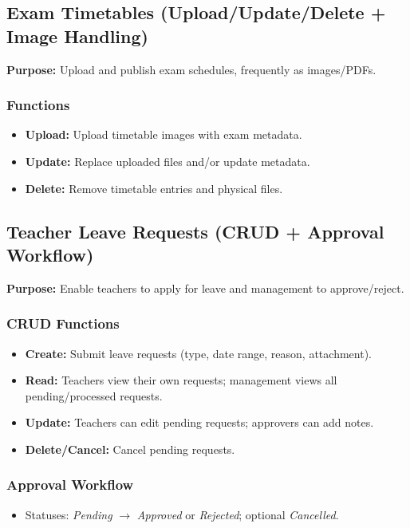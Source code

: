 \documentclass[12pt, a4paper]{report}
\begin{document}
\subsection{Exam Timetables (Upload/Update/Delete + Image Handling)}
\textbf{Purpose:} Upload and publish exam schedules, frequently as images/PDFs.

\subsubsection*{Functions}
\begin{itemize}[leftmargin=*]
  \item \textbf{Upload:} Upload timetable images with exam metadata.
  \item \textbf{Update:} Replace uploaded files and/or update metadata.
  \item \textbf{Delete:} Remove timetable entries and physical files.
\end{itemize}

\subsection{Teacher Leave Requests (CRUD + Approval Workflow)}
\textbf{Purpose:} Enable teachers to apply for leave and management to approve/reject.

\subsubsection*{CRUD Functions}
\begin{itemize}[leftmargin=*]
  \item \textbf{Create:} Submit leave requests (type, date range, reason, attachment).
  \item \textbf{Read:} Teachers view their own requests; management views all pending/processed requests.
  \item \textbf{Update:} Teachers can edit pending requests; approvers can add notes.
  \item \textbf{Delete/Cancel:} Cancel pending requests.
\end{itemize}

\subsubsection*{Approval Workflow}
\begin{itemize}[leftmargin=*]
  \item Statuses: \textit{Pending} $\rightarrow$ \textit{Approved} or \textit{Rejected}; optional \textit{Cancelled}.
\end{itemize}
\end{document}
